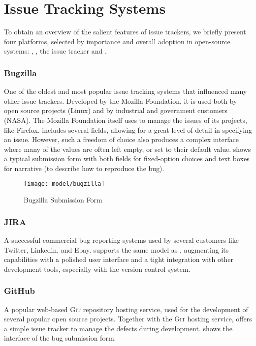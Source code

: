 \section{Issue Tracking Systems}\label{sec:bugtrackers}

To obtain an overview of the salient features of issue trackers, we briefly present four platforms, selected by importance and overall adoption in open-source systems: \bzilla, \jira, the \gth issue tracker and \fbz.

\subsubsection{Bugzilla} One of the oldest and most popular issue tracking systems that influenced many other issue trackers. Developed by the Mozilla Foundation, it is used both by open source projects (\eg Linux) and by industrial and government customers (\eg NASA). The Mozilla Foundation itself uses \bzilla to manage the issues of its projects, like Firefox. \bzilla includes several fields, allowing for a great level of detail in specifying an issue. However, such a freedom of choice also produces a complex interface where many of the values are often left empty, or set to their default value.  shows a typical submission form with both fields for fixed-option choices and text boxes for narrative (\eg to describe how to reproduce the bug).

\begin{figure}[ht]
\centering
  \texttt{[image: model/bugzilla]}
  \caption{Bugzilla Submission Form}
  \label{fig:bugzilla-interface}
\end{figure}

\subsubsection{JIRA} A successful commercial bug reporting systems used by several customers like Twitter, Linkedin, and Ebay. \jira supports the same model as \bzilla, augmenting its capabilities with a polished user interface and a tight integration with other development tools, especially with the version control system.


\subsubsection{GitHub} A popular web-based \textsc{Git} repository hosting service, used for the development of several popular open source projects. Together with the \textsc{Git} hosting service, \gth offers a simple issue tracker to manage the defects during development.  shows the interface of the \gth bug submission form.

